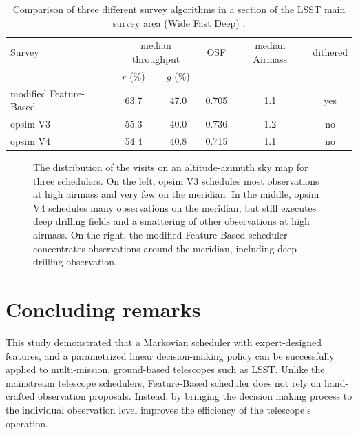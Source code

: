 \documentclass[12pt]{aastex62}
\theoremstyle{definition}
\begin{document}
\begin{table}
\caption{Comparison of three different survey algorithms in a section of the LSST main survey area (Wide Fast Deep) .}\label{OSF_table}
\begin{center}
\begin{tabular}{l|ccccc} \hline
Survey &\multicolumn{2}{c}{median throughput} & OSF & median Airmass & dithered\\
&$r$ (\%) &  $g$ (\%) &&&\\ \hline
modified Feature-Based & 63.7 & 47.0& 0.705 & 1.1 & yes  \\
opsim V3      & 55.3 & 40.0 & 0.736 & 1.2 & no  \\
opsim V4      & 54.4 & 40.8 & 0.715 & 1.1 & no \\ \hline
\end{tabular}
\end{center}
\end{table}



\begin{figure}
\caption{The distribution of the visits on an altitude-azimuth sky map for three schedulers. On the left, opsim V3 schedules most observations at high airmass and very few on the meridian. In the middle, opsim V4 schedules many observations on the meridian, but still executes deep drilling fields and a smattering of other observations at high airmass. On the right, the modified Feature-Based scheduler concentrates observations around the meridian, including deep drilling observation. }\label{fig_all_alt_az}
\end{figure}

\section{Concluding remarks}\label{sec_conclusion}

This study demonstrated that a Markovian scheduler with expert-designed features, and a parametrized linear decision-making policy can be successfully applied to multi-mission, ground-based telescopes such as LSST. Unlike the mainstream telescope schedulers, Feature-Based scheduler does not rely on hand-crafted observation proposals. Instead, by bringing the decision making process to the individual observation level improves the efficiency of the telescope's operation. 
\end{document}
